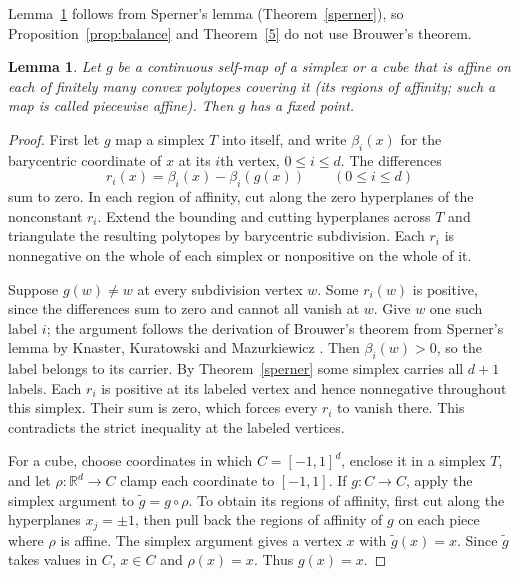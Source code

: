 \documentclass[11pt]{amsart}
\newtheorem{lem}[thm]{Lemma}
\theoremstyle{definition}
\theoremstyle{remark}
\numberwithin{equation}{section}
\newcommand{\R}{\mathbb R}
\begin{document}
Lemma~\ref{pl} follows from Sperner's lemma (Theorem~\ref{sperner}), so Proposition~\ref{prop:balance} and Theorem~\ref{5} do not use Brouwer's theorem.
\begin{lem}\label{pl}
Let $g$ be a continuous self-map of a simplex or a cube that is affine on each of finitely many convex polytopes covering it (its regions of affinity; such a map is called piecewise affine). Then $g$ has a fixed point.
\end{lem}
\begin{proof}
First let $g$ map a simplex $T$ into itself, and write $\beta_i(x)$ for the barycentric coordinate of $x$ at its $i$th vertex, $0\le i\le d$. The differences
\[
            r_i(x)=\beta_i(x)-\beta_i(g(x))
            \qquad (0\le i\le d)
\]
sum to zero. In each region of affinity, cut along the zero hyperplanes of the nonconstant $r_i$. Extend the bounding and cutting hyperplanes across $T$ and triangulate the resulting polytopes by barycentric subdivision. Each $r_i$ is nonnegative on the whole of each simplex or nonpositive on the whole of it.

Suppose $g(w)\ne w$ at every subdivision vertex $w$. Some $r_i(w)$ is positive, since the differences sum to zero and cannot all vanish at $w$. Give $w$ one such label $i$; the argument follows the derivation of Brouwer's theorem from Sperner's lemma by Knaster, Kuratowski and Mazurkiewicz \cite{KKM29}. Then $\beta_i(w)>0$, so the label belongs to its carrier. By Theorem~\ref{sperner} some simplex carries all $d+1$ labels. Each $r_i$ is positive at its labeled vertex and hence nonnegative throughout this simplex. Their sum is zero, which forces every $r_i$ to vanish there. This contradicts the strict inequality at the labeled vertices.

For a cube, choose coordinates in which $C=[-1,1]^d$, enclose it in a simplex $T$, and let $\rho:\R^d\to C$ clamp each coordinate to $[-1,1]$. If $g:C\to C$, apply the simplex argument to $\tilde g=g\circ\rho$. To obtain its regions of affinity, first cut along the hyperplanes $x_j=\pm1$, then pull back the regions of affinity of $g$ on each piece where $\rho$ is affine. The simplex argument gives a vertex $x$ with $\tilde g(x)=x$. Since $\tilde g$ takes values in $C$, $x\in C$ and $\rho(x)=x$. Thus $g(x)=x$.
\end{proof}
\end{document}

